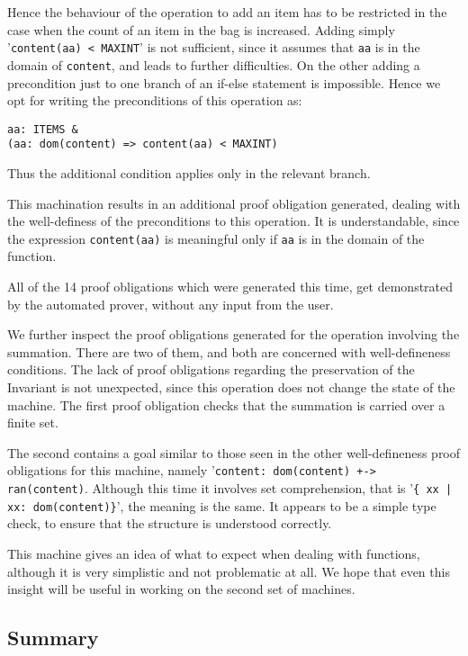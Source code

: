 \documentclass[11pt,journal]{IEEEtran}
\begin{document}
	Hence the behaviour of the operation to add an item has to be restricted in the case when the count of an item in the bag is increased. Adding simply '\texttt{content(aa) < MAXINT}' is not sufficient, since it assumes that \texttt{aa} is in the domain of \texttt{content}, and leads to further difficulties. On the other adding a precondition just to one branch of an if-else statement is impossible. Hence we opt for writing the preconditions of this operation as:
	\begin{lstlisting}
aa: ITEMS &
(aa: dom(content) => content(aa) < MAXINT)
	\end{lstlisting}
	Thus the additional condition applies only in the relevant branch.
	
	This machination results in an additional proof obligation generated, dealing with the well-definess of the preconditions to this operation. It is understandable, since the expression \texttt{content(aa)} is meaningful only if \texttt{aa} is in the domain of the function. 
	
	All of the 14 proof obligations which were generated this time, get demonstrated by the automated prover, without any input from the user.
	
	We further inspect the proof obligations generated for the operation involving the summation. There are two of them, and both are concerned with well-defineness conditions. The lack of proof obligations regarding the preservation of the Invariant is not unexpected, since this operation does not change the state of the machine. The first proof obligation checks that the summation is carried over a finite set. 
	
	The second contains a goal similar to those seen in the other well-defineness proof obligations for this machine, namely '\texttt{content: dom(content) +-> ran(content)}. Although this time it involves set comprehension, that is '\texttt{\{~xx | xx: dom(content)\}}', the meaning is the same. It appears to be a simple type check, to ensure that the structure is understood correctly.
	
	This machine gives an idea of what to expect when dealing with functions, although it is very simplistic and not problematic at all. We hope that even this insight will be useful in working on the second set of machines.
	
	\subsection{Summary}
\end{document}
